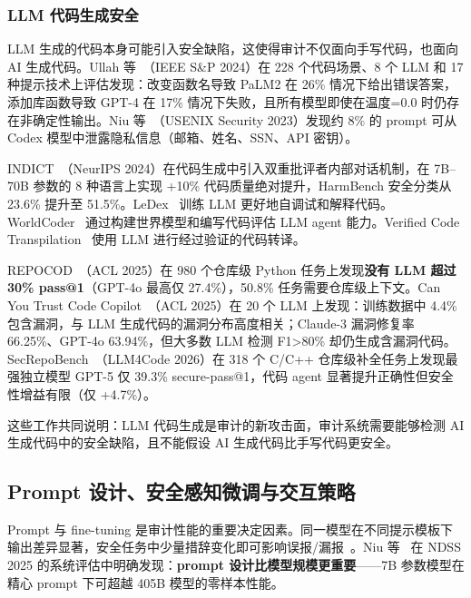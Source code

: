 \documentclass[11pt,a4paper,onecolumn]{article}
\begin{document}
\subsubsection{LLM 代码生成安全}
LLM 生成的代码本身可能引入安全缺陷，这使得审计不仅面向手写代码，也面向 AI 生成代码。Ullah 等~\cite{pearce2023copilot_correctness}（IEEE S\&P 2024）在 228 个代码场景、8 个 LLM 和 17 种提示技术上评估发现：改变函数名导致 PaLM2 在 26\% 情况下给出错误答案，添加库函数导致 GPT-4 在 17\% 情况下失败，且所有模型即使在温度=0.0 时仍存在非确定性输出。Niu 等~\cite{niu2023codexleaks}（USENIX Security 2023）发现约 8\% 的 prompt 可从 Codex 模型中泄露隐私信息（邮箱、姓名、SSN、API 密钥）。

INDICT~\cite{indict2024}（NeurIPS 2024）在代码生成中引入双重批评者内部对话机制，在 7B--70B 参数的 8 种语言上实现 +10\% 代码质量绝对提升，HarmBench 安全分类从 23.6\% 提升至 51.5\%。LeDex~\cite{ledex2024} 训练 LLM 更好地自调试和解释代码。WorldCoder~\cite{worldcoder2024} 通过构建世界模型和编写代码评估 LLM agent 能力。Verified Code Transpilation~\cite{verified_transpile2024} 使用 LLM 进行经过验证的代码转译。

REPOCOD~\cite{repocod2025}（ACL 2025）在 980 个仓库级 Python 任务上发现\textbf{没有 LLM 超过 30\% pass@1}（GPT-4o 最高仅 27.4\%），50.8\% 任务需要仓库级上下文。Can You Trust Code Copilot~\cite{trust_copilot2025}（ACL 2025）在 20 个 LLM 上发现：训练数据中 4.4\% 包含漏洞，与 LLM 生成代码的漏洞分布高度相关；Claude-3 漏洞修复率 66.25\%、GPT-4o 63.94\%，但大多数 LLM 检测 F1>80\% 却仍生成含漏洞代码。SecRepoBench~\cite{secrepobench2025}（LLM4Code 2026）在 318 个 C/C++ 仓库级补全任务上发现最强独立模型 GPT-5 仅 39.3\% secure-pass@1，代码 agent 显著提升正确性但安全性增益有限（仅 +4.7\%）。

这些工作共同说明：LLM 代码生成是审计的新攻击面，审计系统需要能够检测 AI 生成代码中的安全缺陷，且不能假设 AI 生成代码比手写代码更安全。

\subsection{Prompt 设计、安全感知微调与交互策略}
Prompt 与 fine-tuning 是审计性能的重要决定因素。同一模型在不同提示模板下输出差异显著，安全任务中少量措辞变化即可影响误报/漏报~\cite{icode_reviewer_2025,secure_reviewer_2025,eval_code_review_2025,liu_security_review_2024,pornprasit_2024_gpt35,zhang2024prompt}。Niu 等~\cite{niu2025largetomammoth} 在 NDSS 2025 的系统评估中明确发现：\textbf{prompt 设计比模型规模更重要}——7B 参数模型在精心 prompt 下可超越 405B 模型的零样本性能。
\end{document}
